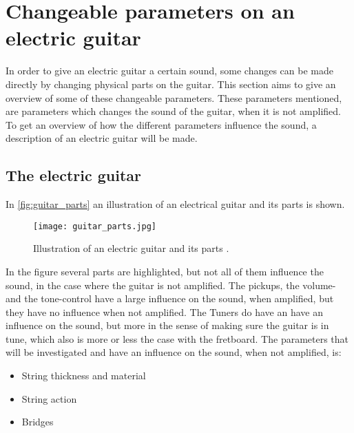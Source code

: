 \section{Changeable parameters on an electric guitar}

In order to give an electric guitar a certain sound, some changes can be made directly by changing physical parts on the guitar. This section aims to give an overview of some of these changeable parameters. These parameters mentioned, are parameters which changes the sound of the guitar, when it is not amplified.
To get an overview of how the different parameters influence the sound, a description of an electric guitar will be made.

\subsection{The electric guitar}

In \autoref{fig:guitar_parts} an illustration of an electrical guitar and its parts is shown.

\begin{figure}[h]
	\centering
		\texttt{[image: guitar\_parts.jpg]}
		\caption{Illustration of an electric guitar and its parts \cite{coustii}.}
		\label{fig:guitar_parts}
\end{figure}

In the figure several parts are highlighted, but not all of them influence the sound, in the case where the guitar is not amplified. The pickups, the volume- and the tone-control have a large influence on the sound, when amplified, but they have no influence when not amplified. The Tuners do have an have an influence on the sound, but more in the sense of making sure the guitar is in tune, which also is more or less the case with the fretboard. 
The parameters that will be investigated and have an influence on the sound, when not amplified, is:

\begin{itemize}
 \item String thickness and material
 \item String action
 \item Bridges
\end{itemize}

